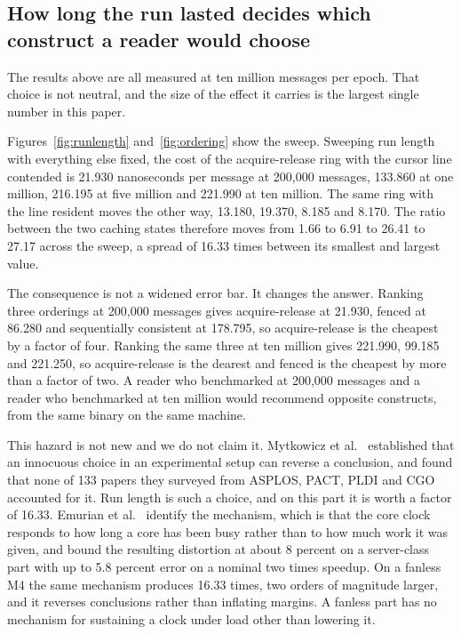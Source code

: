 \documentclass[conference]{IEEEtran}
\begin{document}
\subsection{How long the run lasted decides which construct a reader would
choose}

The results above are all measured at ten million messages per epoch. That
choice is not neutral, and the size of the effect it carries is the largest
single number in this paper.

Figures~\ref{fig:runlength} and~\ref{fig:ordering} show the sweep. Sweeping run length with everything else fixed, the cost of the
acquire-release ring with the cursor line contended is 21.930 nanoseconds per
message at 200,000 messages, 133.860 at one million, 216.195 at five million
and 221.990 at ten million. The same ring with the line resident moves the
other way, 13.180, 19.370, 8.185 and 8.170. The ratio between the two caching
states therefore moves from 1.66 to 6.91 to 26.41 to 27.17 across the sweep, a
spread of 16.33 times between its smallest and largest value.

The consequence is not a widened error bar. It changes the answer. Ranking
three orderings at 200,000 messages gives acquire-release at 21.930, fenced at
86.280 and sequentially consistent at 178.795, so acquire-release is the
cheapest by a factor of four. Ranking the same three at ten million gives
221.990, 99.185 and 221.250, so acquire-release is the dearest and fenced is
the cheapest by more than a factor of two. A reader who benchmarked at 200,000
messages and a reader who benchmarked at ten million would recommend opposite
constructs, from the same binary on the same machine.

This hazard is not new and we do not claim it. Mytkowicz et
al.~\cite{mytkowicz2009wrong} established that an innocuous choice in an
experimental setup can reverse a conclusion, and found that none of 133 papers
they surveyed from ASPLOS, PACT, PLDI and CGO accounted for it. Run length is
such a choice, and on this part it is worth a factor of 16.33. Emurian et
al.~\cite{emurian2014pitfalls} identify the mechanism, which is that the core
clock responds to how long a core has been busy rather than to how much work it
was given, and bound the resulting distortion at about 8 percent on a
server-class part with up to 5.8 percent error on a nominal two times speedup.
On a fanless M4 the same mechanism produces 16.33 times, two orders of
magnitude larger, and it reverses conclusions rather than inflating margins. A
fanless part has no mechanism for sustaining a clock under load other than
lowering it.
\end{document}
